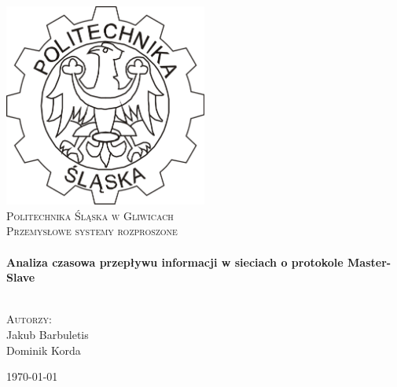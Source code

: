 \begin{titlepage}
\begin{center}

\includegraphics[width=0.5\textwidth]{./img/logo.png}~\\[1cm]

\textsc{\LARGE Politechnika Śląska w Gliwicach}\\[1.5cm]

\textsc{\Large Przemysłowe systemy rozproszone}\\[0.5cm]

\HRule \\[0.4cm]
{ \huge \bfseries Analiza czasowa przepływu informacji w sieciach o protokole Master-Slave  \\[0.4cm] }

\HRule \\[1.5cm]

\textsc{\Large Autorzy:} \\
Jakub Barbuletis \\
Dominik Korda\\

\vfill

{\large \today}

\end{center}
\end{titlepage}
